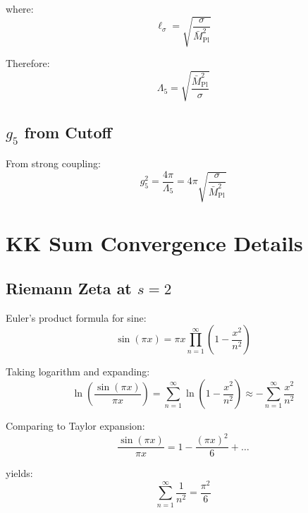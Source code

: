 \documentclass[11pt,a4paper]{article}
\begin{document}
where:
\begin{equation}
\label{eq:ell-sigma}
\ell_\sigma = \sqrt{\frac{\sigma}{\bar{M}_{\text{Pl}}^2}}
\end{equation}

Therefore:
\begin{equation}
\label{eq:lambda5-explicit}
\Lambda_5 = \sqrt{\frac{\bar{M}_{\text{Pl}}^2}{\sigma}}
\end{equation}

\subsection{$g_5$ from Cutoff}
\label{app:g5-cutoff}

From strong coupling:
\begin{equation}
\label{eq:g5-from-lambda}
g_5^2 = \frac{4\pi}{\Lambda_5} = 4\pi \sqrt{\frac{\sigma}{\bar{M}_{\text{Pl}}^2}}
\end{equation}

\section{KK Sum Convergence Details}
\label{app:kk-details}

\subsection{Riemann Zeta at $s=2$}
\label{app:zeta-2}

Euler's product formula for sine:
\begin{equation}
\label{eq:sine-product}
\sin(\pi x) = \pi x \prod_{n=1}^{\infty} \left(1 - \frac{x^2}{n^2}\right)
\end{equation}

Taking logarithm and expanding:
\begin{equation}
\label{eq:log-sine}
\ln\left(\frac{\sin(\pi x)}{\pi x}\right) = \sum_{n=1}^{\infty} \ln\left(1 - \frac{x^2}{n^2}\right)
\approx -\sum_{n=1}^{\infty} \frac{x^2}{n^2}
\end{equation}

Comparing to Taylor expansion:
\begin{equation}
\label{eq:taylor-sine}
\frac{\sin(\pi x)}{\pi x} = 1 - \frac{(\pi x)^2}{6} + \ldots
\end{equation}

yields:
\begin{equation}
\label{eq:zeta-2-derive}
\sum_{n=1}^{\infty} \frac{1}{n^2} = \frac{\pi^2}{6}
\end{equation}
\end{document}
